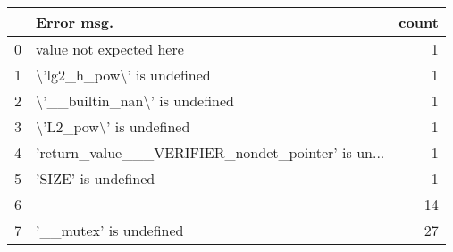 \documentclass[notitlepage]{article}
\begin{document}
\begin{tabular}{llr}
\toprule
{} &                                         Error msg. &  count \\
\midrule
0 &                            value not expected here &      1 \\
1 &                         \textbackslash 'lg2\_h\_pow\textbackslash ' is undefined &      1 \\
2 &                     \textbackslash '\_\_builtin\_nan\textbackslash ' is undefined &      1 \\
3 &                            \textbackslash 'L2\_pow\textbackslash ' is undefined &      1 \\
4 &  'return\_value\_\_\_VERIFIER\_nondet\_pointer' is un... &      1 \\
5 &                                'SIZE' is undefined &      1 \\
6 &                                                    &     14 \\
7 &                             '\_\_mutex' is undefined &     27 \\
\bottomrule
\end{tabular}
\end{document}
